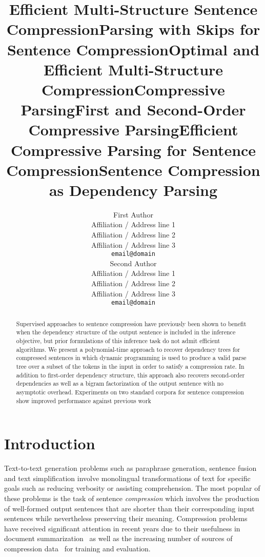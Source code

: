 \documentclass[11pt,a4paper]{article}
\title{Efficient Multi-Structure Sentence Compression}
\title{Parsing with Skips for Sentence Compression}
\title{Optimal and Efficient Multi-Structure Compression}
\title{Compressive Parsing}
\title{First and Second-Order Compressive Parsing}
\title{Efficient Compressive Parsing for Sentence Compression}
\title{Sentence Compression as Dependency Parsing}
\author{First Author \\
  Affiliation / Address line 1 \\
  Affiliation / Address line 2 \\
  Affiliation / Address line 3 \\
  {\tt email@domain} \\\And
  Second Author \\
  Affiliation / Address line 1 \\
  Affiliation / Address line 2 \\
  Affiliation / Address line 3 \\
  {\tt email@domain} \\}
\date{}
\begin{document}
\maketitle
\begin{abstract}
    Supervised approaches to sentence compression have previously been shown
    to benefit when the dependency structure of the output sentence is
    included in the inference objective, but prior formulations of this
    inference task do not admit efficient algorithms.
    We present a polynomial-time approach to recover dependency trees
    for compressed sentences in which dynamic programming is used to
    produce a valid parse tree over a subset of the tokens in the input
    in order to satisfy a compression rate. In addition to first-order
    dependency structure, this approach also recovers
    second-order dependencies as well as a bigram factorization of the
    output sentence with no asymptotic overhead.
    Experiments on two standard corpora for sentence compression show
    improved performance against previous work

\end{abstract}

\section{Introduction}
\label{intro}

Text-to-text generation problems such as paraphrase generation,
sentence fusion and text simplification involve
monolingual transformations of text for specific goals
such as reducing verbosity or assisting comprehension.
The most popular of these problems is the task of
sentence \emph{compression} which involves
the production of well-formed output sentences that are shorter than
their corresponding input sentences while nevertheless preserving their
meaning.
Compression problems have received significant attention in
recent years due to their usefulness in document summarization~\cite{zajic07}
as well as the increasing number of sources of compression
data~\cite{knight00,clarke06a,galanis11,filippova13} for training
and evaluation.

\end{document}
